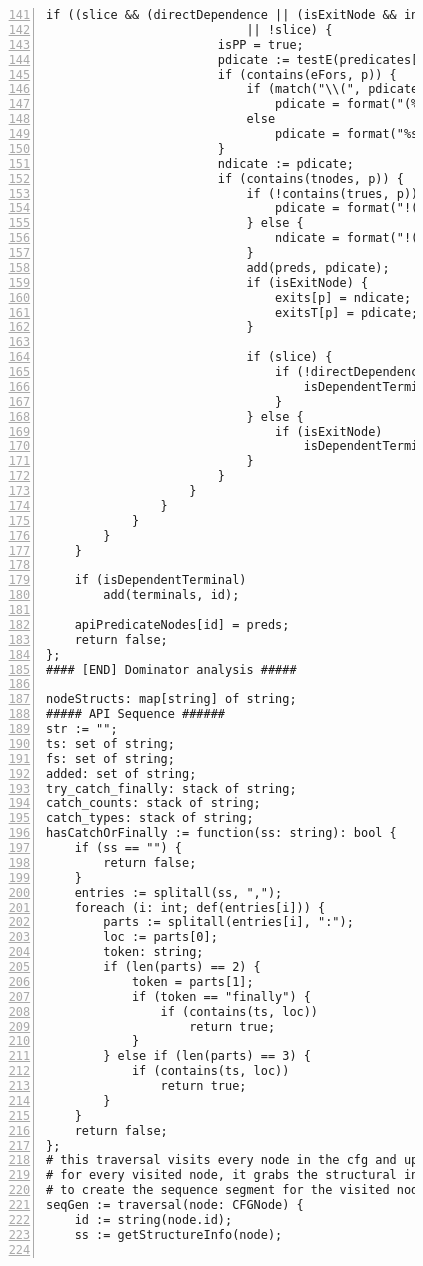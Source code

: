 \begin{figure}[ht!]
\begin{lstlisting}[numbers=left, tabsize=4, escapechar=@, caption={API Usage Mining Analysis},label={lst:aun-code},  firstline = 141, firstnumber = 141, lastline = 201]
                    if ((slice && (directDependence || (isExitNode && indirectDependence))) 
                            || !slice) {
                        isPP = true;
                        pdicate := testE(predicates[p]);
                        if (contains(eFors, p)) {
                            if (match("\\(", pdicate)) 
                                pdicate = format("(%s).size() > 0", pdicate);
                            else
                                pdicate = format("%s.size() > 0", pdicate);
                        }
                        ndicate := pdicate;
                        if (contains(tnodes, p)) {
                            if (!contains(trues, p)) {
                                pdicate = format("!(%s)", pdicate);
                            } else {
                                ndicate = format("!(%s)", ndicate);    
                            }
                            add(preds, pdicate);    
                            if (isExitNode) {
                                exits[p] = ndicate;
                                exitsT[p] = pdicate;
                            }

                            if (slice) {
                                if (!directDependence) {
                                    isDependentTerminal = true;
                                }
                            } else {
                                if (isExitNode)
                                    isDependentTerminal = true;	
                            }
                        }
                    } 
                } 
            }
        }
    } 

    if (isDependentTerminal)
        add(terminals, id);
    
    apiPredicateNodes[id] = preds;
    return false;
};
#### [END] Dominator analysis #####

nodeStructs: map[string] of string;
##### API Sequence ######
str := "";
ts: set of string;
fs: set of string;
added: set of string;
try_catch_finally: stack of string;
catch_counts: stack of string;
catch_types: stack of string;
hasCatchOrFinally := function(ss: string): bool {
    if (ss == "") {
        return false;    
    }
    entries := splitall(ss, ",");
    foreach (i: int; def(entries[i])) {
        parts := splitall(entries[i], ":");
        loc := parts[0];
        token: string;
        if (len(parts) == 2) {
            token = parts[1];
            if (token == "finally") {
                if (contains(ts, loc))
                    return true;
            }
        } else if (len(parts) == 3) {
            if (contains(ts, loc))
                return true;
        }
    }
    return false;
};
# this traversal visits every node in the cfg and updates the sequence
# for every visited node, it grabs the structural information, api calls, and preconditions
# to create the sequence segment for the visited node.
seqGen := traversal(node: CFGNode) {
	id := string(node.id);
	ss := getStructureInfo(node);
	

\end{lstlisting}
\end{figure}
